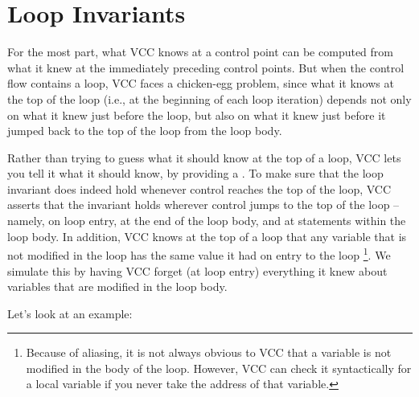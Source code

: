 \section{Loop Invariants}

For the most part, what VCC knows at a control point can be
computed from what it knew at the immediately preceding control
points. But when the control flow contains a loop, VCC faces a
chicken-egg problem, since what it knows at the top of the loop (i.e.,
at the beginning of each loop iteration) depends not only on what it
knew just before the loop, but also on what it knew just before it
jumped back to the top of the loop from the loop body.

Rather than trying to guess what it should know at the top of a loop,
VCC lets you tell it what it should know, by providing a . To make sure that the loop invariant does indeed hold 
whenever control reaches the top
of the loop, VCC asserts that the invariant holds wherever control
jumps to the top of the loop -- namely, on loop entry, at the end of
the loop body, and at  statements within the loop body.
In addition, VCC knows at the top of a loop
that any variable that is not modified in the loop has 
the same value it had on entry to the loop%
\footnote{ Because of aliasing, it is not always obvious to VCC that a
  variable is not modified in the body of the loop. However, VCC can
  check it syntactically for a local variable if you never take the
  address of that variable.}. We simulate this by having VCC forget
(at loop entry) everything it knew about variables that are modified
in the loop body.

Let's look at an example:

